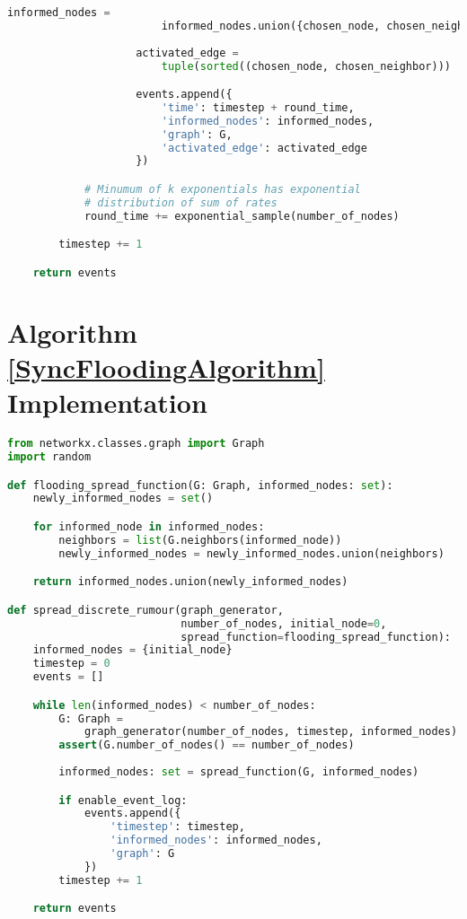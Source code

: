 \begin{lstlisting}[language=Python]
                    informed_nodes = 
                        informed_nodes.union({chosen_node, chosen_neighbor})
                    
                    activated_edge = 
                        tuple(sorted((chosen_node, chosen_neighbor)))

                    events.append({
                        'time': timestep + round_time,
                        'informed_nodes': informed_nodes,
                        'graph': G,
                        'activated_edge': activated_edge
                    })

            # Minumum of k exponentials has exponential 
            # distribution of sum of rates
            round_time += exponential_sample(number_of_nodes)

        timestep += 1

    return events
\end{lstlisting}

\section{Algorithm \ref{SyncFloodingAlgorithm} Implementation}

\begin{lstlisting}[language=Python]
from networkx.classes.graph import Graph
import random

def flooding_spread_function(G: Graph, informed_nodes: set):
    newly_informed_nodes = set()

    for informed_node in informed_nodes:
        neighbors = list(G.neighbors(informed_node))
        newly_informed_nodes = newly_informed_nodes.union(neighbors)

    return informed_nodes.union(newly_informed_nodes)

def spread_discrete_rumour(graph_generator, 
                           number_of_nodes, initial_node=0, 
                           spread_function=flooding_spread_function):
    informed_nodes = {initial_node}
    timestep = 0
    events = []

    while len(informed_nodes) < number_of_nodes:
        G: Graph = 
            graph_generator(number_of_nodes, timestep, informed_nodes)
        assert(G.number_of_nodes() == number_of_nodes)
        
        informed_nodes: set = spread_function(G, informed_nodes)

        if enable_event_log:
            events.append({
                'timestep': timestep,
                'informed_nodes': informed_nodes,
                'graph': G
            })
        timestep += 1

    return events

\end{lstlisting}